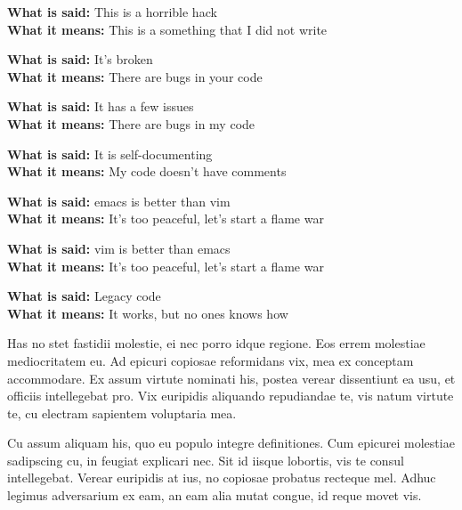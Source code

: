 \documentclass[9pt]{extarticle} %
\begin{document}
%
%
\begin{minipage}[t]{.61\linewidth} %
\vspace{-0.4cm}
\hypertarget{firstnews}{}

\textbf{What is said:} This is a horrible hack \\
\textbf{What it means:} This is a something that I did not write

\textbf{What is said:} It's broken \\
\textbf{What it means:} There are bugs in your code

\textbf{What is said:} It has a few issues \\
\textbf{What it means:} There are bugs in my code 

\textbf{What is said:} It is self-documenting \\
\textbf{What it means:} My code doesn't have comments 

\textbf{What is said:} emacs is better than vim \\
\textbf{What it means:} It's too peaceful, let's start a flame war

\textbf{What is said:} vim is better than emacs \\
\textbf{What it means:} It's too peaceful, let's start a flame war

\textbf{What is said:} Legacy code \\
\textbf{What it means:} It works, but no ones knows how


\hypertarget{secondnews}{} 

Has no stet fastidii molestie, ei nec porro idque regione. Eos errem molestiae mediocritatem eu. Ad epicuri copiosae reformidans vix, mea ex conceptam accommodare. Ex assum virtute nominati his, postea verear dissentiunt ea usu, et officiis intellegebat pro. Vix euripidis aliquando repudiandae te, vis natum virtute te, cu electram sapientem voluptaria mea.

Cu assum aliquam his, quo eu populo integre definitiones. Cum epicurei molestiae sadipscing cu, in feugiat explicari nec. Sit id iisque lobortis, vis te consul intellegebat. Verear euripidis at ius, no copiosae probatus recteque mel. Adhuc legimus adversarium ex eam, an eam alia mutat congue, id reque movet vis.


\end{minipage}
\end{document}
